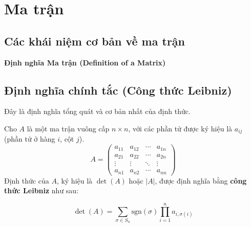 
\chapter{Ma trận}

\section{Các khái niệm cơ bản về ma trận}
\textbf{Định nghĩa Ma trận (Definition of a Matrix)}
\section{Định nghĩa chính tắc (Công thức Leibniz)}

Đây là định nghĩa tổng quát và cơ bản nhất của định thức.

Cho $A$ là một ma trận vuông cấp $n \times n$, với các phần tử được ký hiệu là $a_{ij}$ (phần tử ở hàng $i$, cột $j$).
$$ A = \begin{pmatrix}
a_{11} & a_{12} & \cdots & a_{1n} \\
a_{21} & a_{22} & \cdots & a_{2n} \\
\vdots & \vdots & \ddots & \vdots \\
a_{n1} & a_{n2} & \cdots & a_{nn}
\end{pmatrix} $$
Định thức của $A$, ký hiệu là $\det(A)$ hoặc $|A|$, được định nghĩa bằng \textbf{công thức Leibniz} như sau:

$$ \det(A) = \sum_{\sigma \in S_n} \text{sgn}(\sigma) \prod_{i=1}^{n} a_{i, \sigma(i)} $$

